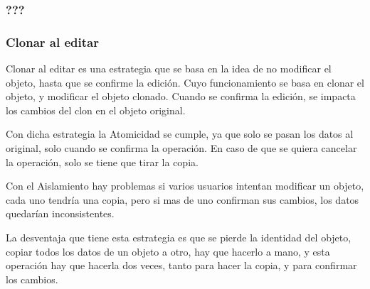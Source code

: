 		
	\subsubsection{???}
	
	
	\subsubsection{Clonar al editar}
	
		Clonar al editar es una estrategia que se basa en la idea de no modificar el
		objeto, hasta que se confirme la edición. Cuyo funcionamiento se basa en 
		clonar el objeto, y modificar el objeto clonado. Cuando se confirma la
		edición, se impacta los cambios del clon en el objeto original.
		
		Con dicha estrategia la Atomicidad se cumple, ya que solo se pasan los datos
		al original, solo cuando se confirma la operación.
		En caso de que se quiera cancelar la operación, solo se tiene que tirar la
		copia.
		
		Con el Aislamiento hay problemas si varios usuarios intentan modificar un
		objeto, cada uno tendría una copia, pero si mas de uno confirman sus cambios,
		los datos quedarían inconsistentes.
		
		La desventaja que tiene esta estrategia es que se pierde la identidad del
		objeto, copiar todos los datos de un objeto a otro, hay que hacerlo a mano, y
		esta operación hay que hacerla dos veces, tanto para hacer la copia, y para
		confirmar los cambios.
